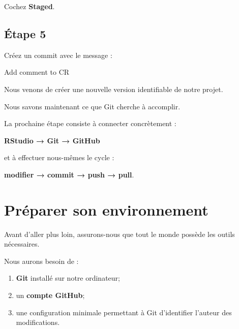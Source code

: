 \documentclass[
  letterpaper,
  DIV=11,
  numbers=noendperiod]{scrreprt}
\newenvironment{Shaded}{\begin{snugshade}}{\end{snugshade}}
\newcommand{\NormalTok}[1]{\textcolor[rgb]{0.00,0.23,0.31}{#1}}
\providecommand{\tightlist}{%
  \setlength{\itemsep}{0pt}\setlength{\parskip}{0pt}}\usepackage{longtable,booktabs,array}
\begin{document}
Cochez \textbf{Staged}.

\subsection{Étape 5}\label{uxe9tape-5}

Créez un commit avec le message :

\begin{Shaded}
\begin{Highlighting}[]
\NormalTok{Add comment to CR}
\end{Highlighting}
\end{Shaded}

Nous venons de créer une nouvelle version identifiable de notre projet.

\begin{tcolorbox}[enhanced jigsaw, arc=.35mm, title=\textcolor{quarto-callout-note-color}{\faInfo}\hspace{0.5em}{La suite}, colback=white, left=2mm, rightrule=.15mm, toptitle=1mm, opacityback=0, bottomtitle=1mm, breakable, colframe=quarto-callout-note-color-frame, coltitle=black, toprule=.15mm, titlerule=0mm, opacitybacktitle=0.6, bottomrule=.15mm, colbacktitle=quarto-callout-note-color!10!white, leftrule=.75mm]

Nous savons maintenant ce que Git cherche à accomplir.

La prochaine étape consiste à connecter concrètement :

\textbf{RStudio → Git → GitHub}

et à effectuer nous-mêmes le cycle :

\textbf{modifier → commit → push → pull}.

\end{tcolorbox}

\section{Préparer son
environnement}\label{pruxe9parer-son-environnement}

Avant d'aller plus loin, assurons-nous que tout le monde possède les
outils nécessaires.

Nous aurons besoin de :

\begin{enumerate}
\def\labelenumi{\arabic{enumi}.}
\tightlist
\item
  \textbf{Git} installé sur notre ordinateur;
\item
  un \textbf{compte GitHub};
\item
  une configuration minimale permettant à Git d'identifier l'auteur des
  modifications.
\end{enumerate}
\end{document}
